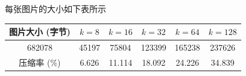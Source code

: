 \documentclass[lang=cn,11pt]{elegantpaper}
\begin{document}
每张图片的大小如下表所示
\begin{table}[h]
    \centering
    \begin{tabular}{c|ccccc}
    \hline
    图片大小 (字节)  & $k=8$   & $k=16$   & $k=32$   & $k=64$   & $k=128$  \\ \hline
    682078   & 45197 & 75804  & 123399 & 165238 & 237626 \\
    压缩率 (\%) & 6.626 & 11.114 & 18.092 & 24.226 & 34.839 \\ \hline
    \end{tabular}
\end{table}


\newpage
\nocite{*}



\end{document}
